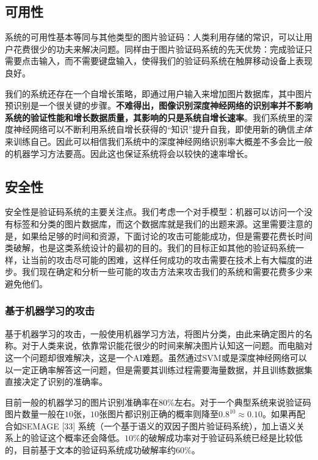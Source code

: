 \documentclass[bachelor,zhspacing]{cqu}  %
\begin{document}
\subsection{可用性}\label{ux53efux7528ux6027}

系统的可用性基本等同与其他类型的图片验证码：人类利用存储的常识，可以让用户花费很少的功夫来解决问题。同样由于图片验证码系统的先天优势：完成验证只需要点击输入，而不需要键盘输入，使得我们的验证码系统在触屏移动设备上表现良好。

我们的系统还存在一个自增长策略，即通过用户输入来增加图片数据库，其中图片预识别是一个很关键的步骤。\textbf{不难得出，图像识别深度神经网络的识别率并不影响系统的验证性能和增长数据质量，其影响的只是系统自增长速率}。我们系统里的深度神经网络可以不断利用系统自增长获得的``知识''提升自我，即使用新的确信\emph{主体}来训练自己。因此可以相信我们系统中的深度神经网络识别率大概差不多会比一般的机器学习方法要高。因此这也保证系统将会以较快的速率增长。

\subsection{安全性}\label{ux5b89ux5168ux6027}

安全性是验证码系统的主要关注点。我们考虑一个对手模型：机器可以访问一个没有标签和分类的图片数据库，而这个数据库就是我们的出题来源。这里需要注意的是，如果给足够的时间和资源，下面讨论的攻击可能能成功，但是需要花费长时间类破解，也是这类系统设计的最初的目的。我们的目标正如其他的验证码系统一样，让当前的攻击尽可能的困难，这样任何成功的攻击需要在技术上有大幅度的进步。我们现在确定和分析一些可能的攻击方法来攻击我们的系统和需要花费多少来避免他们。

\subsubsection{基于机器学习的攻击}\label{ux57faux4e8eux673aux5668ux5b66ux4e60ux7684ux653bux51fb}

基于机器学习的攻击，一般使用机器学习方法，将图片分类，由此来确定图片的名称。对于人类来说，依靠常识能花很少的时间来解决图片认知这一问题。而电脑对这一个问题却很难解决，这是一个AI难题。虽然通过SVM或是深度神经网络可以以一定正确率解答这一问题，但是需要其训练过程需要海量数据，并且训练数据集直接决定了识别的准确率。

目前一般的机器学习的图片识别准确率在\(80\%\)左右。对于一个典型系统来说验证码图片数量一般在\(10\)张，\(10\)张图片都识别正确的概率则降至\(0.8^{10} \approx 0.10\)。如果再配合如SEMAGE
{[}33{]}
系统（一个基于语义的双因子图片验证码系统），加上语义关系上的验证这个概率还会降低。\(10\%\)的破解成功率对于验证码系统已经是比较低的，目前基于文本的验证码系统成功破解率约\(60\%\)。
\end{document}
